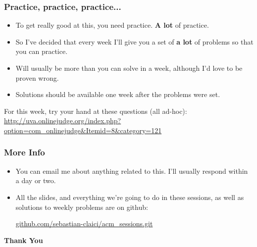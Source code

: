 \documentclass[svgnames,dvipsnames,usenames]{beamer}
\begin{document}
\begin{frame}
    \frametitle{Practice, practice, practice...}
    \begin{itemize}
            \pause
        \item To get really good at this, you need practice. \textbf{A lot} of practice.
            \pause
        \item So I've decided that every week I'll give you a set of \textbf{a lot} of problems so that you can practice.
            \pause
        \item Will usually be more than you can solve in a week, although I'd love to be proven wrong.
            \pause
        \item Solutions should be available one week after the problems were set.
    \end{itemize}

    \pause
    For this week, try your hand at these questions (all ad-hoc): \url{http://uva.onlinejudge.org/index.php?option=com_onlinejudge&Itemid=8&category=121}
\end{frame}

\begin{frame}
    \frametitle{More Info}
    \begin{itemize}
            \pause
        \item You can email me about anything related to this. I'll usually respond within a day or two.
            \pause
        \item All the slides, and everything we're going to do in these sessions, as well as solutions to weekly problems are on github:
            \begin{center}
                \href{https://github.com/sebastian-claici/acm\_sessions.git}{github.com/sebastian-claici/acm\_sessions.git}
            \end{center}
            \pause
    \end{itemize}
\end{frame}

\begin{frame}
    \vspace*{\fill}
    \begin{center}
        \huge \textbf{Thank You}
    \end{center}
    \vspace*{\fill}
\end{frame}
\end{document}
